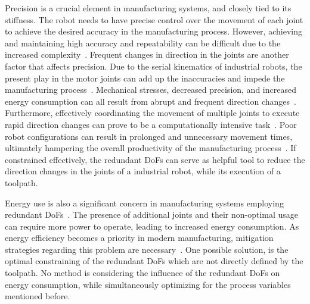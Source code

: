 Precision is a crucial element in manufacturing systems, and closely tied to its stiffness. The robot needs to have precise control over the movement of each joint to achieve the desired accuracy in the manufacturing process. However, achieving and maintaining high accuracy and repeatability can be difficult due to the increased complexity~\cite{Duong.2021}. %
Frequent changes in direction in the joints are another factor that affects precision. 
Due to the serial kinematics of industrial robots, the present play in the motor joints can add up the inaccuracies and impede the manufacturing process~\cite{Huynh.2020, ChenGang.2014}. Mechanical stresses, decreased precision, and increased energy consumption can all result from abrupt and frequent direction changes~\cite{Gasparetto.2010}. Furthermore, effectively coordinating the movement of multiple joints to execute rapid direction changes can prove to be a computationally intensive task~\cite{VandeWeghe.2007}. Poor robot configurations can result in prolonged and unnecessary movement times, ultimately hampering the overall productivity of the manufacturing process~\cite{Reiter.2016}. %
If constrained effectively, the redundant \acrshort{DoF}s can serve as helpful tool to reduce the direction changes in the joints of a industrial robot, while its execution of a toolpath. 




Energy use is also a significant concern in manufacturing systems employing redundant \acrshort{DoF}s~\cite{Doan.2016}. The presence of additional joints and their non-optimal usage can require more power to operate, leading to increased energy consumption. As energy efficiency becomes a priority in modern manufacturing, mitigation strategies regarding this problem are necessary~\cite{Boscariol.2020, Boscariol.2019}. One possible solution, is the optimal constraining of the redundant \acrshort{DoF}s which are not directly defined by the toolpath. No method is considering the influence of the redundant \acrshort{DoF}s on energy consumption, while simultaneously optimizing for the process variables mentioned before.

